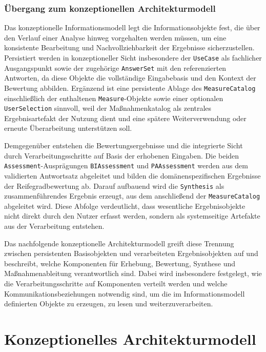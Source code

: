 \subsubsection{Übergang zum konzeptionellen Architekturmodell}
Das konzeptionelle Informationsmodell legt die Informationsobjekte fest, die über den Verlauf einer Analyse hinweg vorgehalten werden müssen, um eine konsistente Bearbeitung und Nachvollziehbarkeit der Ergebnisse sicherzustellen. Persistiert werden in konzeptioneller Sicht insbesondere der \texttt{UseCase} als fachlicher Ausgangspunkt sowie der zugehörige \texttt{AnswerSet} mit den referenzierten Antworten, da diese Objekte die vollständige Eingabebasis und den Kontext der Bewertung abbilden. Ergänzend ist eine persistente Ablage des \texttt{MeasureCatalog} einschließlich der enthaltenen \texttt{Measure}-Objekte sowie einer optionalen \texttt{UserSelection} sinnvoll, weil der Maßnahmenkatalog als zentrales Ergebnisartefakt der Nutzung dient und eine spätere Weiterverwendung oder erneute Überarbeitung unterstützen soll.

Demgegenüber entstehen die Bewertungsergebnisse und die integrierte Sicht durch Verarbeitungsschritte auf Basis der erhobenen Eingaben. Die beiden \texttt{Assessment}-Ausprägungen \texttt{BIAssessment} und \texttt{PAAssessment} werden aus dem validierten Antwortsatz abgeleitet und bilden die domänenspezifischen Ergebnisse der Reifegradbewertung ab. Darauf aufbauend wird die \texttt{Synthesis} als zusammenführendes Ergebnis erzeugt, aus dem anschließend der \texttt{MeasureCatalog} abgeleitet wird. Diese Abfolge verdeutlicht, dass wesentliche Ergebnisobjekte nicht direkt durch den Nutzer erfasst werden, sondern als systemseitige Artefakte aus der Verarbeitung entstehen.

Das nachfolgende konzeptionelle Architekturmodell greift diese Trennung zwischen persistenten Basisobjekten und verarbeiteten Ergebnisobjekten auf und beschreibt, welche Komponenten für Erhebung, Bewertung, Synthese und Maßnahmenableitung verantwortlich sind. Dabei wird insbesondere festgelegt, wie die Verarbeitungsschritte auf Komponenten verteilt werden und welche Kommunikationsbeziehungen notwendig sind, um die im Informationsmodell definierten Objekte zu erzeugen, zu lesen und weiterzuverarbeiten.


\section{Konzeptionelles Architekturmodell}\label{sec:konzeptionellesArchitekturmodell}
